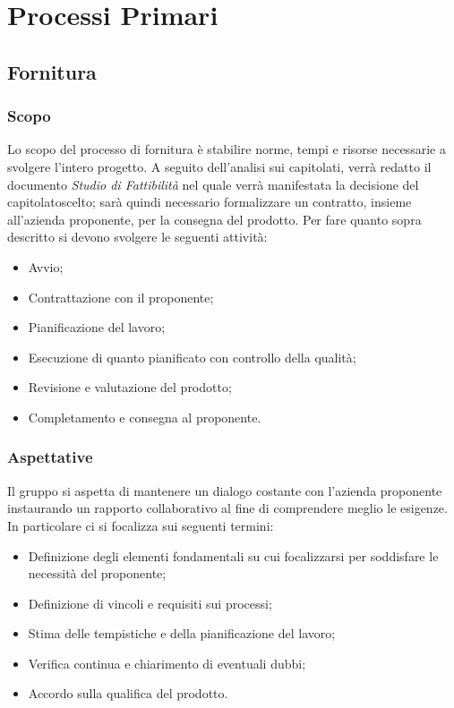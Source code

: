 \section{Processi Primari}
\subsection{Fornitura}
\subsubsection{Scopo}
Lo scopo del processo di fornitura è stabilire norme, tempi e risorse necessarie a svolgere l'intero progetto.
A seguito dell'analisi sui capitolati, verrà redatto il documento \textit{Studio di Fattibilità} nel quale verrà manifestata la decisione del capitolato\glosp scelto; sarà quindi necessario formalizzare un contratto, insieme all'azienda proponente, per la consegna del prodotto. 
Per fare quanto sopra descritto si devono svolgere le seguenti attività:
\begin{itemize}
	\item Avvio;
	\item Contrattazione con il proponente;
	\item Pianificazione del lavoro;
	\item Esecuzione di quanto pianificato con controllo della qualità;
	\item Revisione e valutazione del prodotto;
	\item Completamento e consegna al proponente.
\end{itemize}
\subsubsection{Aspettative}
Il gruppo si aspetta di mantenere un dialogo costante con l'azienda proponente instaurando un rapporto collaborativo al fine di comprendere meglio le esigenze. In particolare ci si focalizza sui seguenti termini:
\begin{itemize}
	\item Definizione degli elementi fondamentali su cui focalizzarsi per soddisfare le necessità del proponente;
	\item Definizione di vincoli e requisiti sui processi;
	\item Stima delle tempistiche e della pianificazione del lavoro;
	\item Verifica continua e chiarimento di eventuali dubbi;
	\item Accordo sulla qualifica del prodotto.
\end{itemize} 
